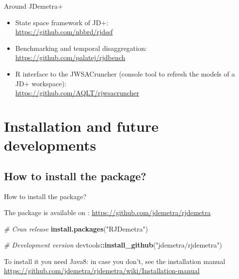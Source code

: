 \documentclass[10pt,xcolor=table,color={dvipsnames,usenames},ignorenonframetext,usepdftitle=false,french]{beamer}
\newenvironment{Shaded}{\begin{snugshade}}{\end{snugshade}}
\newcommand{\CommentTok}[1]{\textcolor[rgb]{0.56,0.35,0.01}{\textit{#1}}}
\newcommand{\KeywordTok}[1]{\textcolor[rgb]{0.13,0.29,0.53}{\textbf{#1}}}
\newcommand{\NormalTok}[1]{#1}
\newcommand{\OperatorTok}[1]{\textcolor[rgb]{0.81,0.36,0.00}{\textbf{#1}}}
\newcommand{\StringTok}[1]{\textcolor[rgb]{0.31,0.60,0.02}{#1}}
\providecommand{\tightlist}{%
  \setlength{\parskip}{0pt}
  }
\begin{document}
\begin{frame}{Around JDemetra+}
\protect\hypertarget{around-jdemetra-1}{}

\begin{itemize}
\tightlist
\item
  State space framework of JD+:\\
  \faGithub{} \url{https://github.com/nbbrd/rjdssf}
\end{itemize}

\medskip

\begin{itemize}
\tightlist
\item
  Benchmarking and temporal disaggregation:\\
  \faGithub{} \url{https://github.com/palatej/rjdbench}
\end{itemize}

\medskip

\begin{itemize}
\tightlist
\item
  R interface to the JWSACruncher (console tool to refresh the models of
  a JD+ workspace):\\
  \faGithub{} \url{https://github.com/AQLT/rjwsacruncher}
\end{itemize}

\end{frame}

\hypertarget{installation-and-future-developments}{%
\section{Installation and future
developments}\label{installation-and-future-developments}}

\hypertarget{how-to-install-the-package}{%
\subsection{How to install the
package?}\label{how-to-install-the-package}}

\begin{frame}[fragile]{How to install the package?}
\protect\hypertarget{how-to-install-the-package-1}{}

The package is available on \large\faGithub\normalsize:
\url{https://github.com/jdemetra/rjdemetra}

\begin{Shaded}
\begin{Highlighting}[]
\CommentTok{# Cran release}
\KeywordTok{install.packages}\NormalTok{(}\StringTok{"RJDemetra"}\NormalTok{)}

\CommentTok{# Development version}
\NormalTok{devtools}\OperatorTok{::}\KeywordTok{install_github}\NormalTok{(}\StringTok{"jdemetra/rjdemetra"}\NormalTok{)}
\end{Highlighting}
\end{Shaded}

\bcinfo To install it you need Java8: in case you don't, see the
installation manual\\
\url{https://github.com/jdemetra/rjdemetra/wiki/Installation-manual}

\end{frame}
\end{document}
